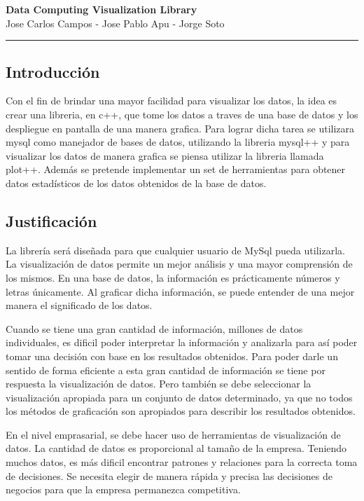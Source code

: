 \documentclass[11pt]{article}
\begin{document}
\begin{center}
{ \huge \bfseries Data Computing Visualization Library }\\[0.2cm]
{ Jose Carlos Campos - Jose Pablo Apu - Jorge Soto }\\[0.2cm]
\rule{\linewidth}{0.25mm}
\end{center}

\subsection*{Introducción}
Con el fin de brindar una mayor facilidad para visualizar los datos, 
la idea es crear una libreria, en c++, que tome los datos a traves de una 
base de datos y los despliegue en pantalla de una manera grafica. Para lograr 
dicha tarea se utilizara mysql como manejador de bases de datos, utilizando 
la libreria mysql++ y para visualizar los datos de manera grafica se piensa 
utilizar la libreria llamada plot++. Además se pretende implementar un set 
de herramientas para obtener datos estadísticos de los datos obtenidos de la base de datos. 

\subsection*{Justificación}
La librería será diseñada para que cualquier usuario de MySql pueda utilizarla.
La visualización de datos permite un mejor análisis y una mayor comprensión 
de los mismos. En una base de datos, la información es prácticamente números 
y letras únicamente. Al graficar dicha información, se puede entender de una mejor
manera el significado de los datos.

Cuando se tiene una gran cantidad de información, millones de datos individuales, 
es dificil poder interpretar la información y analizarla para así poder tomar
una decisión con base en los resultados obtenidos. Para poder darle un sentido
de forma eficiente a esta gran cantidad de información se tiene por respuesta 
la visualización de datos. Pero también se debe seleccionar la visualización
apropiada para un conjunto de datos determinado, ya que no todos los métodos 
de graficación son apropiados para describir los resultados obtenidos.\cite{oreilly} 

En el nivel emprasarial, se debe hacer uso de herramientas de visualización de datos.
La cantidad de datos es proporcional al tamaño de la empresa. Teniendo muchos datos, 
es más dificil encontrar patrones y relaciones para la correcta toma de decisiones. 
Se necesita elegir de manera rápida y precisa las decisiones de negocios para que 
la empresa permanezca competitiva.\cite{dundas}
\end{document}
